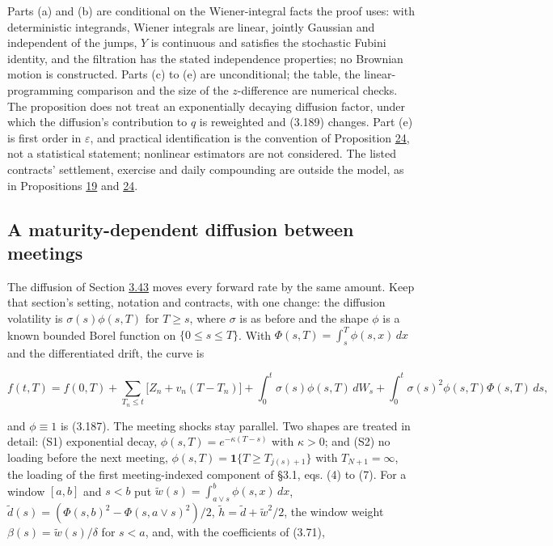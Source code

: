 \documentclass[11pt]{article}
\begin{document}
Parts (a) and (b) are conditional on the Wiener-integral facts the proof uses: with deterministic integrands, Wiener integrals are linear, jointly Gaussian and independent of the jumps, \(Y\) is continuous and satisfies the stochastic Fubini identity, and the filtration has the stated independence properties; no Brownian motion is constructed. Parts (c) to (e) are unconditional; the table, the linear-programming comparison and the size of the \(z\)-difference are numerical checks. The proposition does not treat an exponentially decaying diffusion factor, under which the diffusion's contribution to \(q\) is reweighted and (3.189) changes. Part (e) is first order in \(\varepsilon\), and practical identification is the convention of Proposition \hyperref[res:Proposition-24]{24}, not a statistical statement; nonlinear estimators are not considered. The listed contracts' settlement, exercise and daily compounding are outside the model, as in Propositions \hyperref[res:Proposition-19]{19} and \hyperref[res:Proposition-24]{24}.

\subsection{A maturity-dependent diffusion between meetings}\label{sec:3.44}

The diffusion of Section \hyperref[sec:3.43]{3.43} moves every forward rate by the same amount. Keep that section's setting, notation and contracts, with one change: the diffusion volatility is \(\sigma(s)\phi(s,T)\) for \(T\ge s\), where \(\sigma\) is as before and the shape \(\phi\) is a known bounded Borel function on \(\{0\le s\le T\}\). With \(\Phi(s,T)=\int_s^T\phi(s,x)\,dx\) and the differentiated drift, the curve is

\begin{equation*}
f(t,T)=f(0,T)+\sum_{T_n\le t}\bigl[Z_n+v_n(T-T_n)\bigr]+\int_0^t\sigma(s)\phi(s,T)\,dW_s+\int_0^t\sigma(s)^2\phi(s,T)\Phi(s,T)\,ds, \tag{3.193}\label{eq:3.193}
\end{equation*}

and \(\phi\equiv1\) is (3.187). The meeting shocks stay parallel. Two shapes are treated in detail: (S1) exponential decay, \(\phi(s,T)=e^{-\kappa(T-s)}\) with \(\kappa>0\); and (S2) no loading before the next meeting, \(\phi(s,T)=\mathbf 1\{T\ge T_{j(s)+1}\}\) with \(T_{N+1}=\infty\), the loading of the first meeting-indexed component of \cite{brace2024sofr} §3.1, eqs. (4) to (7). For a window \([a,b]\) and \(s<b\) put \(\tilde w(s)=\int_{a\vee s}^b\phi(s,x)\,dx\), \(\tilde d(s)=(\Phi(s,b)^2-\Phi(s,a\vee s)^2)/2\), \(\tilde h=\tilde d+\tilde w^2/2\), the window weight \(\beta(s)=\tilde w(s)/\delta\) for \(s<a\), and, with the coefficients of (3.71),
\end{document}
